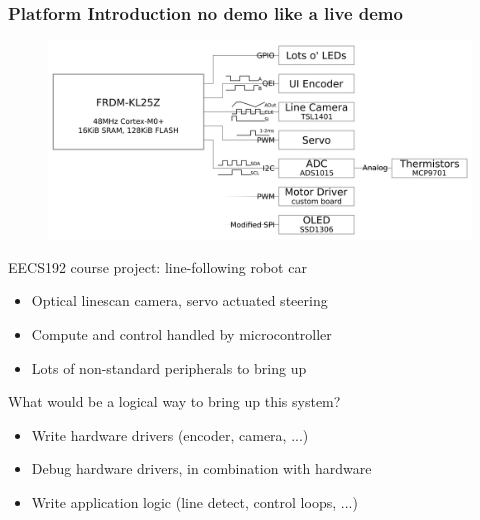\documentclass{beamer}
\begin{document}
\begin{frame}
\frametitle{Platform Introduction \small{no demo like a live demo}}
\begin{figure}
  \centering
  \def\svgwidth{\columnwidth}
  \tiny \includegraphics[width = 0.8\columnwidth]{images/192-block-diagram}
\end{figure}

 {
EECS192 course project: line-following robot car
\begin{itemize}
  \item Optical linescan camera, servo actuated steering
  \item Compute and control handled by microcontroller
  \item Lots of non-standard peripherals to bring up
\end{itemize}
}
 {
What would be a logical way to bring up this system?
 {
\begin{itemize}
  \item Write hardware drivers (encoder, camera, ...)
  \item Debug hardware drivers, in combination with hardware
  \item Write application logic (line detect, control loops, ...)
\end{itemize}
}
}
\end{frame}

\end{document}
